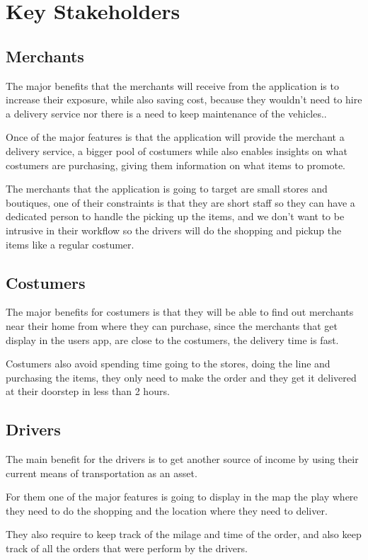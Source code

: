 \section{Key Stakeholders}

\subsection{Merchants}
The major benefits that the merchants will receive from the application is to 
increase their exposure, while also saving cost, because they wouldn't need to 
hire a delivery service nor there is a need to keep maintenance 
of the vehicles..\newline

\noindent Once of the major features is that the application will provide the 
merchant a delivery service, a bigger pool of costumers while also enables 
insights on what costumers are purchasing, giving them information on what 
items to promote.\newline

\noindent The merchants that the application is going to target are small 
stores and boutiques, one of their constraints is that they are short staff so 
they can have a dedicated person to handle the picking up the items, and we 
don’t want to be intrusive in their workflow so the drivers will do the 
shopping and pickup the items like a regular costumer.

\subsection{Costumers}

The major benefits for costumers is that they will be able to find out 
merchants near their home from where they can purchase, since the merchants 
that get display in the users app, are close to the costumers, the delivery 
time is fast.\newline

\noindent Costumers also avoid spending time going to the stores, doing the 
line and purchasing the items, they only need to make the order and they get 
it delivered at their doorstep in less than 2 hours.

\pagebreak

\subsection{Drivers}

The main benefit for the drivers is to get another source of income by using 
their current means of transportation as an asset. \newline

\noindent For them one of the major features is going to display in the map 
the play where they need to do the shopping and the location where they need 
to deliver. \newline

\noindent They also require to keep track of the milage and time of the order, 
and also keep track of all the orders that were perform by the drivers.